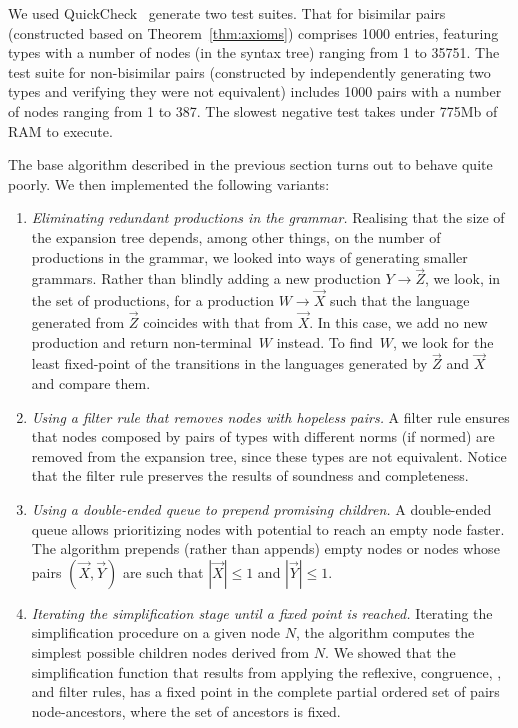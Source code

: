 We used QuickCheck~\cite{DBLP:conf/icfp/ClaessenH00} generate two test
suites. That for bisimilar pairs (constructed based on
Theorem~\ref{thm:axioms}) comprises 1000 entries, featuring types with
a number of nodes (in the syntax tree) ranging from 1 to 35751. The
test suite for non-bisimilar pairs (constructed by independently
generating two types and verifying they were not equivalent) includes
1000 pairs with a number of nodes ranging from 1 to 387.
%
The slowest negative test takes under 775Mb of RAM to execute.

The base algorithm described in the previous section turns out to
behave quite poorly. We then implemented the
following variants:
%
\begin{enumerate}
\item \emph{Eliminating redundant productions in the grammar.}
  Realising that the size of the expansion tree depends, among other
  things, on the number of productions in the grammar, we looked into
  ways of generating smaller grammars. Rather than blindly adding a
  new production $Y \rightarrow \vec Z$, we look, in the set of
  productions, for a production $W \rightarrow \vec X$ such that the
  language generated from $\vec Z$ coincides with that from $\vec
  X$. In this case, we add no new production and return
  non-terminal~$W$ instead. To find~$W$, we look for the least
  fixed-point of the transitions in the languages generated by
  $\vec Z$ and $\vec X$ and compare them.
  \item
  \emph{Using a filter rule that removes nodes with hopeless pairs.} A
  filter rule ensures that nodes composed by pairs of types with
  different norms (if normed) are removed from the expansion tree,
  since these types are not equivalent.  Notice that the filter rule
  preserves the results of soundness and completeness.
  \item
  \emph{Using a double-ended queue to prepend promising children.} A
  double-ended queue allows prioritizing nodes with potential to reach
  an empty node faster.  The algorithm prepends (rather than appends)
  empty nodes or nodes whose pairs $(\vec X, \vec Y)$ are such that
  $|\vec X|\leq 1$ and $|\vec Y| \leq 1$.
  \item
  \emph{Iterating the simplification stage until a fixed point is
    reached.} Iterating the simplification procedure on a given node
  $N$, the algorithm computes the simplest possible children nodes
  derived from $N$. We showed that the simplification function that
  results from applying the reflexive, congruence, \BPA, and filter
  rules, has a fixed point in the complete partial ordered set of
  pairs node-ancestors, where the set of ancestors is fixed.
\end{enumerate}

